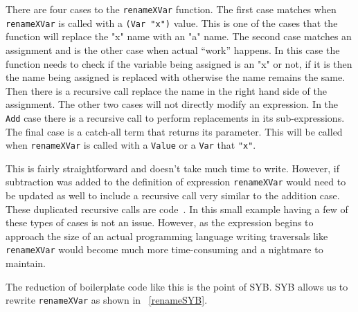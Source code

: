 	There are four cases to the \texttt{renameXVar} function. The first case matches when \texttt{renameXVar} is called with a \texttt{(Var "x")} value. This is one of the cases that the function will replace the "x" name with an "a" name. The second case matches an assignment and is the other case when actual ``work'' happens. In this case the function needs to check if the variable being assigned is an "x" or not, if it is then the name being assigned is replaced with \DIFdelbegin {}\DIFdelend \DIFaddbegin \texttt{} \DIFaddend otherwise the name remains the same. Then there is a recursive call replace the name in the right hand side of the assignment. The other two cases will not directly modify an expression. In the \texttt{Add} case there is \DIFdelbegin {}\DIFdelend a recursive call to perform replacements in its sub-expressions. The final case is \DIFdelbegin {}\DIFdelend a catch-all term that returns its parameter. This will be called when \texttt{renameXVar} is called with a \texttt{Value} or a \texttt{Var} that \DIFdelbegin {}\DIFdelend \DIFaddbegin {}\DIFaddend \texttt{"x"}.

	This is fairly straightforward and doesn't take much time to write. However, if subtraction was added to the definition of expression \texttt{renameXVar} would need to be updated as well to include a recursive call very similar to the addition case. These duplicated recursive calls are  \DIFdelbegin {}\DIFdelend \DIFaddbegin {}\DIFaddend code~\citep{syb}. \DIFdelbegin {}\DIFdelend In this small example having a few of these types of cases is not an issue. However, as the expression \DIFaddbegin {}\DIFaddend begins to approach the size of an actual programming language writing traversals like \texttt{renameXVar} would become much more time-consuming and a nightmare to maintain. 

	The reduction of boilerplate code like this is the point of SYB. SYB allows us to rewrite \texttt{renameXVar} as shown in \DIFdelbegin {}\DIFdelend \DIFaddbegin {}\DIFaddend ~\ref{renameSYB}.

